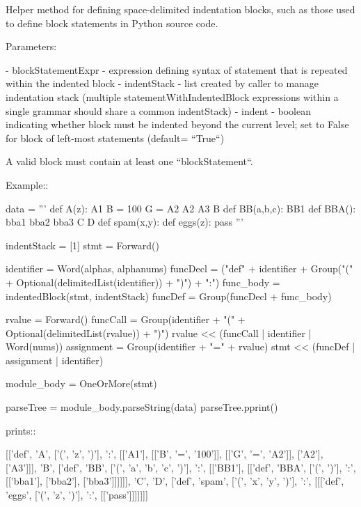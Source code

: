 \begin{DoxyVerb}Helper method for defining space-delimited indentation blocks,
such as those used to define block statements in Python source code.

Parameters:

 - blockStatementExpr - expression defining syntax of statement that
   is repeated within the indented block
 - indentStack - list created by caller to manage indentation stack
   (multiple statementWithIndentedBlock expressions within a single
   grammar should share a common indentStack)
 - indent - boolean indicating whether block must be indented beyond
   the current level; set to False for block of left-most
   statements (default= ``True``)

A valid block must contain at least one ``blockStatement``.

Example::

    data = '''
    def A(z):
      A1
      B = 100
      G = A2
      A2
      A3
    B
    def BB(a,b,c):
      BB1
      def BBA():
        bba1
        bba2
        bba3
    C
    D
    def spam(x,y):
         def eggs(z):
             pass
    '''


    indentStack = [1]
    stmt = Forward()

    identifier = Word(alphas, alphanums)
    funcDecl = ("def" + identifier + Group("(" + Optional(delimitedList(identifier)) + ")") + ":")
    func_body = indentedBlock(stmt, indentStack)
    funcDef = Group(funcDecl + func_body)

    rvalue = Forward()
    funcCall = Group(identifier + "(" + Optional(delimitedList(rvalue)) + ")")
    rvalue << (funcCall | identifier | Word(nums))
    assignment = Group(identifier + "=" + rvalue)
    stmt << (funcDef | assignment | identifier)

    module_body = OneOrMore(stmt)

    parseTree = module_body.parseString(data)
    parseTree.pprint()

prints::

    [['def',
      'A',
      ['(', 'z', ')'],
      ':',
      [['A1'], [['B', '=', '100']], [['G', '=', 'A2']], ['A2'], ['A3']]],
     'B',
     ['def',
      'BB',
      ['(', 'a', 'b', 'c', ')'],
      ':',
      [['BB1'], [['def', 'BBA', ['(', ')'], ':', [['bba1'], ['bba2'], ['bba3']]]]]],
     'C',
     'D',
     ['def',
      'spam',
      ['(', 'x', 'y', ')'],
      ':',
      [[['def', 'eggs', ['(', 'z', ')'], ':', [['pass']]]]]]]
\end{DoxyVerb}
 \mbox{\label{namespacepyparsing_acdf84dac66cbf76ba8850d88ce9556ed}} 

